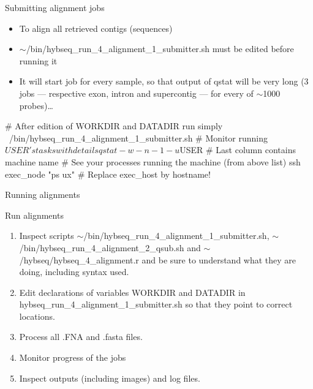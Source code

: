 \documentclass[compress, ucs, xelatex, 11pt, xcolor=x11names, aspectratio=169,
	hyperref={
		bookmarks=true,
		unicode=true,
		colorlinks=true,
		pdftitle={HybSeq course},
		plainpages=false,
		pdfauthor={Vojtech Zeisek},
		pdfsubject={Practical processing of HybSeq target enrichment sequencing data on computing grids like MetaCentrum},
		pdfcreator={XeLaTeX},
		pdfkeywords={BASH, command line, GNU, HybSeq, Linux, MetaCentrum, sequencing shell, target enrichment},
		linkcolor=Cyan2, %
		anchorcolor=Firebrick2, %
		citecolor=Firebrick2, %
		filecolor=Firebrick2, %
		menucolor=Firebrick2, %
		urlcolor=Chartreuse2, %
		pdftex},
	url={hyphens, lowtilde} %
	]{beamer}
\renewcommand{\texttt}[1]{\colorbox{Snow4}{{\ttfamily #1}}}
\renewcommand{\alert}[1]{\textcolor{OrangeRed2}{#1}}
\begin{document}
\begin{frame}[fragile]{Submitting alignment jobs}
	\begin{itemize}
		\item To align all retrieved contigs (sequences)
		\item \alert{\texttt{$\sim$/bin/hybseq\_run\_4\_alignment\_1\_submitter.sh} must be edited before running it}
		\item It will start job for every sample, so that output of \texttt{qstat} will be very long (3 jobs --- respective exon, intron and supercontig --- for every of $\sim$1000 probes)\ldots
	\end{itemize}
	\begin{bashcode}
    # After edition of WORKDIR and DATADIR run simply
    ~/bin/hybseq_run_4_alignment_1_submitter.sh
    # Monitor running $USER's tasks with details
    qstat -w -n -1 -u $USER # Last column contains machine name
    # See your processes running the machine (from above list)
    ssh exec_node "ps ux" # Replace exec_host by hostname!
	\end{bashcode}
\end{frame}

\begin{frame}{Running alignments}
	\begin{exampleblock}{Run alignments}
		\begin{enumerate}
			\item Inspect scripts \texttt{$\sim$/bin/hybseq\_run\_4\_alignment\_1\_submitter.sh}, \texttt{$\sim$/bin/hybseq\_run\_4\_alignment\_2\_qsub.sh} and \texttt{$\sim$/hybseq/hybseq\_4\_alignment.r} and be sure to understand what they are doing, including syntax used.
			\item Edit declarations of variables \texttt{WORKDIR} and \texttt{DATADIR} in \texttt{hybseq\_run\_4\_alignment\_1\_submitter.sh} so that they point to correct locations.
			\item Process all \texttt{*.FNA} and \texttt{*.fasta} files.
			\item Monitor progress of the jobs
			\item Inspect outputs (including images) and log files.
		\end{enumerate}
	\end{exampleblock}
\end{frame}
\end{document}
